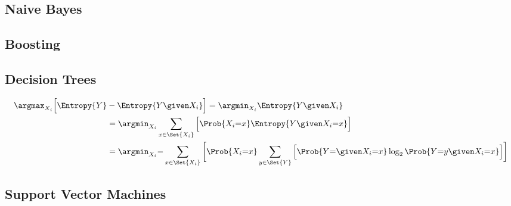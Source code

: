 \documentclass[18pt,a3paper,landscape, ncols=3]{cheatsheet}
\begin{document}
	\subsection{Naive Bayes}
		\begin{mdframed}
			\vspace{10mm}
		\end{mdframed}
		\begin{mdframed}
			\vspace{20mm}
		\end{mdframed}

\vfill\null
\columnbreak

	\subsection{Boosting}
		\begin{mdframed}
			\vspace{10mm}
		\end{mdframed}
		\begin{mdframed}
			\vspace{20mm}
		\end{mdframed}
	\subsection{Decision Trees}
		\begin{mdframed}
			\begin{align*}
		    \argmax_{X_i} \Big\lbrack \Entropy{Y} &- \Entropy{Y \given X_i} \Big\rbrack = \argmin_{X_i} \Entropy{Y \given X_i} \\
		      &= \argmin_{X_i} \sum_{x \in \Set{X_i}} \Big\lbrack \Prob{X_i{=}x} \Entropy{Y \given X_i{=}x} \Big\rbrack \\
		      &= \argmin_{X_i} {-} \sum_{x \in \Set{X_i}} \bigg\lbrack \Prob{X_i{=}x} \sum_{y \in \Set{Y}} \Big\lbrack \Prob{Y{=} \given X_i{=}x} \log_2 \Prob{Y{=}y \given X_i{=}x} \Big\rbrack \bigg\rbrack
		  \end{align*}
		\end{mdframed}
		\begin{mdframed}
			\vspace{20mm}
		\end{mdframed}
	\subsection{Support Vector Machines}
		\begin{mdframed}
			\vspace{10mm}
		\end{mdframed}
		\begin{mdframed}
			\vspace{30mm}
		\end{mdframed}
\end{document}
